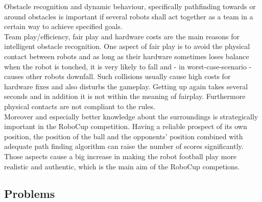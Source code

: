 \documentclass[lnicst,a4paper]{svmultln}
\begin{document}
Obstacle recognition and dynamic behaviour, specifically pathfinding towards or around obstacles is important if several robots shall act together as a team in a certain way to achieve specified goals.
\\
Team play/efficiency, fair play and hardware costs are the main reasons for intelligent obstacle recognition. One aspect of fair play is to avoid the physical contact between robots and as long as their hardware sometimes loses balance when the robot is touched, it is very likely to fall and - in worst-case-scenario - causes other robots downfall. Such collisions usually cause high costs for hardware fixes and also disturbs the gameplay. Getting up again takes several seconds and in addition it is not within the meaning of fairplay. Furthermore physical contacts are not compliant to the rules.
\\
Moreover and especially better knowledge about the surroundings is strategically important in the RoboCup competition. Having a reliable prospect of its own position, the position of the ball and the opponents' position combined with adequate path finding algorithm can raise the number of scores significantly.
\\
Those aspects cause a big increase in making the robot football play more realistic and authentic, which is the main aim of the RoboCup competions.





\subsection{Problems}
\end{document}
